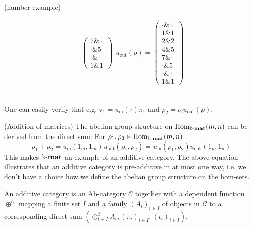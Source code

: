\begin{example}{(number example)}
\begin{minipage}[t]{.5\textwidth}
\begin{align*}
\begin{array}{rr}
\begin{pmatrix}
7 \ampersand \cdot \\
\cdot \ampersand 5 \\
\cdot \ampersand \cdot \\
1 \ampersand 1
\end{pmatrix}
\end{array}
u_{\text{out}}(\rho) = \begin{pmatrix}
\cdot \ampersand 1 \\
1 \ampersand 1 \\
2 \ampersand 2 \\
4 \ampersand 5 \\
7 \ampersand \cdot \\
\cdot \ampersand 5 \\
\cdot \ampersand \cdot \\
1 \ampersand 1
\end{pmatrix}
\end{align*}
\end{minipage}\\

\noindent One can easily verify that e.g. $\tau_{1} = u_{\mathrm{in}}(\tau) \pi_{1}$ and $\rho_{2} = \iota_{2} u_{\mathrm{out}}(\rho)$.
\end{example}

\begin{remark}{(Addition of matrices)}
The abelian group structure on $\mathrm{Hom}_{\Bbbk\textnormal{-}\mathbf{mat}}(m,n)$ can be derived from the direct sum:
For $\rho_{1}, \rho_{2} \in \mathrm{Hom}_{\Bbbk\textnormal{-}\mathbf{mat}}(m,n)$
\[
\rho_{1} + \rho_{2} = u_{\mathrm{in}}(1_{m},1_{m}) u_{\mathrm{out}}(\rho_{1},\rho_{2}) 
= u_{\mathrm{in}}(\rho_{1},\rho_{2})u_{\mathrm{out}}(1_{n},1_{n})
\]
This makes $\Bbbk\textnormal{-}\mathbf{mat}$ an example of an additive category. The above equation illustrates that an additive category is
pre-additive in at most one way, i.e. we don't have a choice how we define the abelian group structure on the hom-sets.
\end{remark}

\begin{definition}\label{def:additive_category}
An \ul{additive category} is an Ab-category $\mathcal{C}$ together with a dependent function $\oplus^{\mathcal{C}}$ mapping
a finite set $I$ and a family $(A_{i})_{i\in I}$ of objects in $\mathcal{C}$ to a corresponding direct sum $(\oplus_{i\in I}^{\mathcal{C}} A_{i},
(\pi_{i})_{i\in I}, (\iota_{i})_{i\in I})$.
\end{definition}

